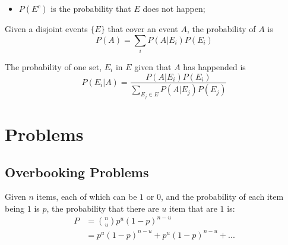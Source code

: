     \begin{itemize}
      \item $ P\left( E^{c} \right) $ is the probability that $ E $ does not happen;
    \end{itemize}
    
    Given a disjoint events $ \{ E \} $ that cover an event $ A $, the probability of $ A $ is
    \begin{equation}
      P\left( A \right) = \sum_{i} P\left( A | E_{i} \right) P\left( E_{i} \right)
    \end{equation}
    
    The probability of one set, $ E_{i} $ in $ E $ given that $ A $ has happended is 
    \begin{equation}
      P\left( E_{i} | A \right) = \frac{ P\left( A | E_{i} \right) P\left( E_{i} \right) }{ \sum_{E_{j} \in E} P\left( A | E_{j} \right) P\left( E_{j} \right) }
    \end{equation}

\section{Problems}

  \subsection{Overbooking Problems}
  
    Given $ n $ items, each of which can be $ 1 $ or $ 0 $, and the probability of each item being $ 1 $ is $ p $, the probability that there are $ u $ item that are $ 1 $ is:
    \begin{align}
      P &= {n \choose u} p^{u} \left( 1 - p \right)^{n - u} \\
      &= p^{u} \left( 1 - p \right)^{n - u} + p^{u} \left( 1 - p \right)^{n - u} + ...
    \end{align}
    
